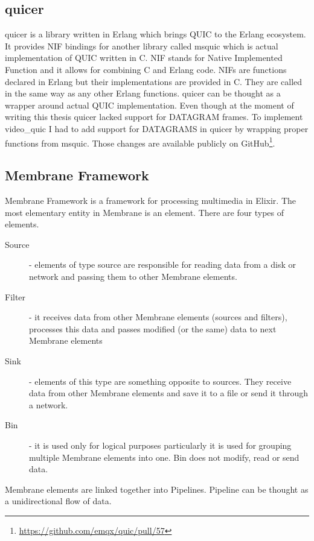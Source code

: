 \subsection{quicer}
\label{subsec:quicer}
quicer is a library written in Erlang which brings QUIC to the Erlang ecosystem.
It provides NIF bindings for another library called msquic which is actual implementation of QUIC written in C\@.
NIF stands for Native Implemented Function and it allows for combining C and Erlang code.
NIFs are functions declared in Erlang but their implementations are provided in C\@.
They are called in the same way as any other Erlang functions.
quicer can be thought as a wrapper around actual QUIC implementation.
Even though at the moment of writing this thesis quicer lacked support for DATAGRAM frames.
To implement video\_quic I had to add support for DATAGRAMS in quicer by wrapping proper functions from msquic.
Those changes are available publicly on GitHub\footnote{\url{https://github.com/emqx/quic/pull/57}}.

\subsection{Membrane Framework}
\label{subsec:membrane-framework}
Membrane Framework is a framework for processing multimedia in Elixir.
The most elementary entity in Membrane is an element.
There are four types of elements.
\begin{description}
    \item [Source] - elements of type source are responsible for reading data from a disk or network and passing them to
    other Membrane elements.
    \item [Filter] - it receives data from other Membrane elements (sources and filters), processes this data and passes
    modified (or the same) data to next Membrane elements
    \item [Sink] - elements of this type are something opposite to sources.
    They receive data from other Membrane elements and save it to a file or send it through a network.
    \item [Bin] - it is used only for logical purposes particularly it is used for grouping multiple Membrane elements into one.
    Bin does not modify, read or send data.
\end{description}
Membrane elements are linked together into Pipelines.
Pipeline can be thought as a unidirectional flow of data.

